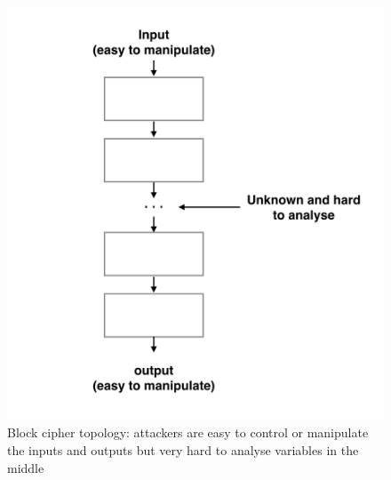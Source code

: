 \begin{figure}[h!]
	\centering
	\includegraphics[width=130mm]{./pics/block_cipher_topology2.png}	
	\caption{Block cipher topology: attackers are easy to control or manipulate the inputs and outputs but very hard to analyse variables in the middle}
	\label{fig:blockciphertopology}
\end{figure}	



